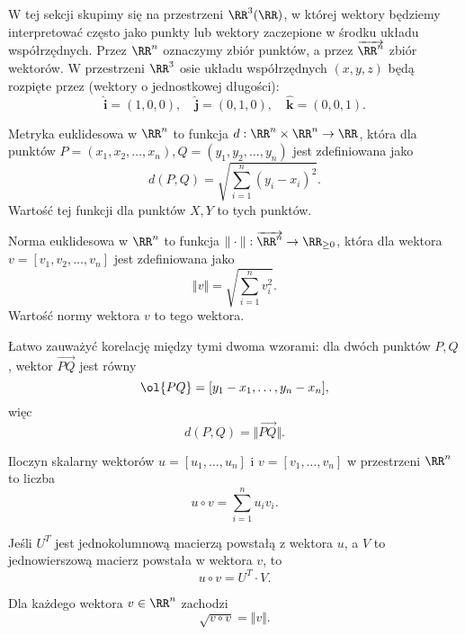 W tej sekcji skupimy się na przestrzeni $\RR^3(\RR)$, w której wektory będziemy interpretować często jako punkty lub wektory zaczepione w środku układu współrzędnych. Przez $\RR^n$ oznaczymy zbiór punktów, a przez $\overrightarrow{\RR^n}$ zbiór wektorów. W przestrzeni $\RR^3$ osie  układu współrzędnych $(x, y, z)$ będą rozpięte przez  (wektory o jednostkowej długości):
\[ \mathbf{\hat{i}} = (1, 0, 0), \quad \mathbf{\hat{j}} = (0, 1, 0), \quad \mathbf{\hat{k}} = (0, 0, 1). \]

\begin{definition}
    \label{d:Euclidean metric}
    Metryka euklidesowa w $\RR^n$ to funkcja $d : \RR^n \times \RR^n \to \RR$, która dla punktów $P = (x_1, x_2, \ldots, x_n), Q = (y_1, y_2, \ldots, y_n)$ jest zdefiniowana jako
    \[ d(P, Q) = \sqrt{\sum_{i = 1}^n (y_i - x_i)^2}. \]
    Wartość tej funkcji dla punktów $X, Y$ to  tych punktów.
\end{definition}

\begin{definition}
    Norma euklidesowa w $\RR^n$ to funkcja $\Vert\cdot\Vert : \overrightarrow{\RR^n} \to \RR_{\geq 0}$, która dla wektora $v = [v_1, v_2, \ldots, v_n]$ jest zdefiniowana jako
    \[ \Vert v\Vert = \sqrt{\sum_{i=1}^n v_i^2}. \]
    Wartość normy wektora $v$ to  tego wektora.
\end{definition}

Łatwo zauważyć korelację między tymi dwoma wzorami: dla dwóch punktów $P, Q$, wektor $\overrightarrow{PQ}$ jest równy
\[ \ol{PQ} = [y_1 - x_1, \ldots, y_n - x_n], \]
więc
\[ d(P, Q) = \Vert\overrightarrow{PQ}\Vert. \]

\begin{definition}
    Iloczyn skalarny wektorów $u = [u_1, \ldots, u_n]$ i $v = [v_1, \ldots, v_n]$ w przestrzeni $\RR^n$ to liczba
    \[ u \circ v = \sum_{i=1}^n u_iv_i. \]
\end{definition}

\begin{fact}
    Jeśli $U^T$ jest jednokolumnową macierzą powstałą z wektora $u$, a $V$ to jednowierszową macierz powstała w wektora $v$, to
    \[ u \circ v = U^T \cdot V. \]
\end{fact}

\begin{fact}
    Dla każdego wektora $v \in \RR^n$ zachodzi
    \[ \sqrt{v \circ v} = \Vert v \Vert. \]
\end{fact}

